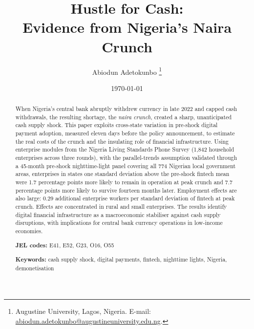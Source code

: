 \documentclass[12pt]{article}
\theoremstyle{remark}
\begin{document}
\title{%
  Hustle for Cash:\\
  Evidence from Nigeria's Naira Crunch%
}

\author{%
  Abiodun Adetokunbo%
  \thanks{%
    Augustine University, Lagos, Nigeria.
    E-mail: \href{mailto:abiodun.adetokunbo@augustineuniversity.edu.ng}%
      {abiodun.adetokunbo@augustineuniversity.edu.ng}.%
  }%
}


\date{\today}
\maketitle
\thispagestyle{empty}

\begin{abstract}
\noindent
When Nigeria's central bank abruptly withdrew currency in late 2022 and capped
cash withdrawals, the resulting shortage, the \emph{naira crunch}, created
a sharp, unanticipated cash supply shock. This paper exploits cross-state
variation in pre-shock digital payment adoption, measured eleven days before
the policy announcement, to estimate the real costs of the crunch and the
insulating role of financial infrastructure. Using enterprise modules from the
Nigeria Living Standards Phone Survey (1,842 household enterprises across three
rounds), with the parallel-trends assumption validated through a 45-month
pre-shock nighttime-light panel covering all 774 Nigerian local government
areas, enterprises in states one standard deviation above the pre-shock fintech
mean were 1.7 percentage points more likely to remain in operation at peak
crunch and 7.7 percentage points more likely to survive fourteen months later.
Employment effects are also large: 0.29 additional enterprise workers per
standard deviation of fintech at peak crunch.
Effects are concentrated in rural and small enterprises. The results identify
digital financial infrastructure as a macroeconomic stabiliser against cash
supply disruptions, with implications for central bank currency operations in
low-income economies.

\medskip
\noindent
\textbf{JEL codes:} E41, E52, G23, O16, O55

\noindent
\textbf{Keywords:} cash supply shock, digital payments, fintech, nighttime
lights, Nigeria, demonetisation
\end{abstract}

\clearpage
\setcounter{page}{1}
\end{document}

